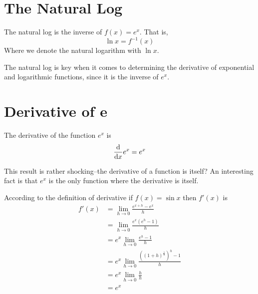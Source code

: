 \documentclass[working]{tuftebook}
\begin{document}
\section{The Natural Log}
\begin{definition}
    The natural log is the inverse of $f(x)=e^x$. That is, 
    \[
        \ln x=f^{-1}(x)
    \]
    Where we denote the natural logarithm with $ \ln x$.
\end{definition}
The natural log is key when it comes to determining the derivative of exponential and logarithmic functions, since it is the inverse of $e^x$. 

\section{Derivative of e}
\begin{theorem}\label{thm:e^x derivative}
    The derivative of the function $e^x$ is 
    \[
        \dv{}{x} e^x=e^x
    \]

\end{theorem}
This result is rather shocking--the derivative of a function is itself? An interesting fact is that $e^x$ is the only function where the derivative is itself.
\begin{myproof}
    According to the definition of derivative if $f(x)= \sin x$ then $f'(x)$ is
    \begin{align*}
        f'(x)&= \lim_{h\to 0} \frac{e^{x+h}-e^x}{h}\\ 
             &= \lim_{h\to 0} \frac{e^x(e^h-1)}{h}\\
             &= e^x \lim_{h\to 0} \frac{e^h-1}{h}\\ 
             &= e^x \lim_{h\to 0} \frac{((1+ h)^ \frac{1}{h})^h-1}{h}\\
             &= e^x \lim_{h\to 0} \frac{h}{h}\\ 
             &= e^x
    \end{align*}

    \end{myproof}
\end{document}
